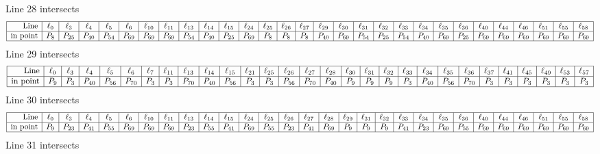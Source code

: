 \documentclass{article}
\begin{document}
{$$$$
Line 28 intersects 
$$
\begin{array}{|r*{28}{|c}|}
\hline
\mbox{Line}  & \ell_{0} & \ell_{3} & \ell_{4} & \ell_{5} & \ell_{6} & \ell_{10} & \ell_{11} & \ell_{13} & \ell_{14} & \ell_{15} & \ell_{24} & \ell_{25} & \ell_{26} & \ell_{27} & \ell_{29} & \ell_{30} & \ell_{31} & \ell_{32} & \ell_{33} & \ell_{34} & \ell_{35} & \ell_{36} & \ell_{40} & \ell_{44} & \ell_{46} & \ell_{51} & \ell_{55} & \ell_{58}\\
\hline
\mbox{in point}  & P_{8} & P_{25} & P_{40} & P_{54} & P_{69} & P_{69} & P_{69} & P_{54} & P_{40} & P_{25} & P_{69} & P_{8} & P_{8} & P_{8} & P_{40} & P_{69} & P_{54} & P_{25} & P_{54} & P_{40} & P_{69} & P_{25} & P_{69} & P_{69} & P_{69} & P_{69} & P_{69} & P_{69}\\
\hline
\end{array}
$$
Line 29 intersects 
$$
\begin{array}{|r*{28}{|c}|}
\hline
\mbox{Line}  & \ell_{0} & \ell_{3} & \ell_{4} & \ell_{5} & \ell_{6} & \ell_{7} & \ell_{11} & \ell_{13} & \ell_{14} & \ell_{15} & \ell_{21} & \ell_{25} & \ell_{26} & \ell_{27} & \ell_{28} & \ell_{30} & \ell_{31} & \ell_{32} & \ell_{33} & \ell_{34} & \ell_{35} & \ell_{36} & \ell_{37} & \ell_{41} & \ell_{45} & \ell_{49} & \ell_{53} & \ell_{57}\\
\hline
\mbox{in point}  & P_{9} & P_{3} & P_{40} & P_{56} & P_{70} & P_{3} & P_{3} & P_{70} & P_{40} & P_{56} & P_{3} & P_{3} & P_{56} & P_{70} & P_{40} & P_{9} & P_{9} & P_{9} & P_{3} & P_{40} & P_{56} & P_{70} & P_{3} & P_{3} & P_{3} & P_{3} & P_{3} & P_{3}\\
\hline
\end{array}
$$
Line 30 intersects 
$$
\begin{array}{|r*{28}{|c}|}
\hline
\mbox{Line}  & \ell_{0} & \ell_{3} & \ell_{4} & \ell_{5} & \ell_{6} & \ell_{10} & \ell_{11} & \ell_{13} & \ell_{14} & \ell_{15} & \ell_{24} & \ell_{25} & \ell_{26} & \ell_{27} & \ell_{28} & \ell_{29} & \ell_{31} & \ell_{32} & \ell_{33} & \ell_{34} & \ell_{35} & \ell_{36} & \ell_{40} & \ell_{44} & \ell_{46} & \ell_{51} & \ell_{55} & \ell_{58}\\
\hline
\mbox{in point}  & P_{9} & P_{23} & P_{41} & P_{55} & P_{69} & P_{69} & P_{69} & P_{23} & P_{55} & P_{41} & P_{69} & P_{55} & P_{23} & P_{41} & P_{69} & P_{9} & P_{9} & P_{9} & P_{41} & P_{23} & P_{69} & P_{55} & P_{69} & P_{69} & P_{69} & P_{69} & P_{69} & P_{69}\\
\hline
\end{array}
$$
Line 31 intersects 
$$
\begin{array}{|r*{28}{|c}|}

\end{array}$$}
\end{document}
